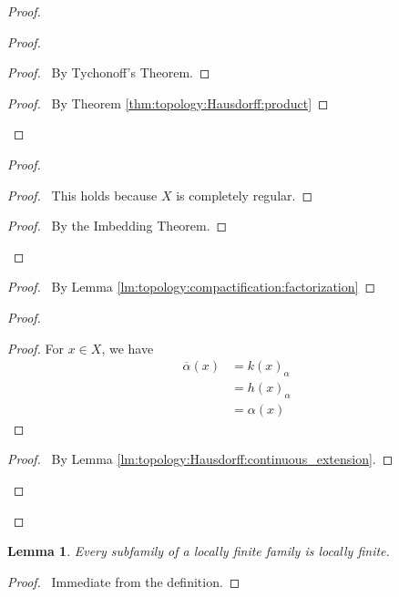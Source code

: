 \documentclass{report}
\let\qed\relax
\newtheorem{lm}{Lemma}[section]
\theoremstyle{definition}
\begin{document}
\begin{proof}
  \pf
  \begin{proof}
    \begin{proof}
      \pf\ By Tychonoff's Theorem.
    \end{proof}
    \begin{proof}
      \pf\ By Theorem \ref{thm:topology:Hausdorff:product}
    \end{proof}
  \end{proof}
  \begin{proof}
    \begin{proof}
      \pf\ This holds because $X$ is completely regular.
    \end{proof}
    \qedstep
    \begin{proof}
      \pf\ By the Imbedding Theorem.
    \end{proof}
  \end{proof}
  \begin{proof}
    \pf\ By Lemma \ref{lm:topology:compactification:factorization}
  \end{proof}
  \begin{proof}
    \begin{proof}
      \pf For $x \in X$, we have
      \begin{align*}
        \overline{\alpha}(x) & = k(x)_\alpha \\
        & = h(x)_\alpha \\
        & = \alpha(x)
      \end{align*}
    \end{proof}
    \begin{proof}
      \pf\ By Lemma \ref{lm:topology:Hausdorff:continuous_extension}.
    \end{proof}
  \end{proof}
  \qed
\end{proof}

\begin{lm}
  \label{lm:topology:locally_finite:subfamily}
  Every subfamily of a locally finite family is locally finite.
\end{lm}

\begin{proof}
  \pf\ Immediate from the definition. \qed
\end{proof}
\end{document}
